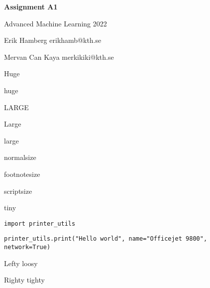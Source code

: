 \documentclass[10pt]{article}
\begin{document}
    \begin{center}
        \textbf{\Huge Assignment A1}

        {\Large Advanced Machine Learning 2022}

        Erik Hamberg erikhamb@kth.se

        Mervan Can Kaya merkikiki@kth.se

        \Huge Huge

        \huge huge

        \LARGE LARGE

        \Large Large

        \large large

        \normalsize normalsize

        \footnotesize footnotesize

        \scriptsize scriptsize

        \tiny tiny    \normalsize
    \end{center}

    \texttt{import printer\_utils }

    \texttt{printer\_utils.print("Hello world", name="Officejet 9800", network=True)}

    \begin{flushleft}
        Lefty loosy
    \end{flushleft}
    \begin{flushright}
        Righty tighty
    \end{flushright}

    
\end{document}
